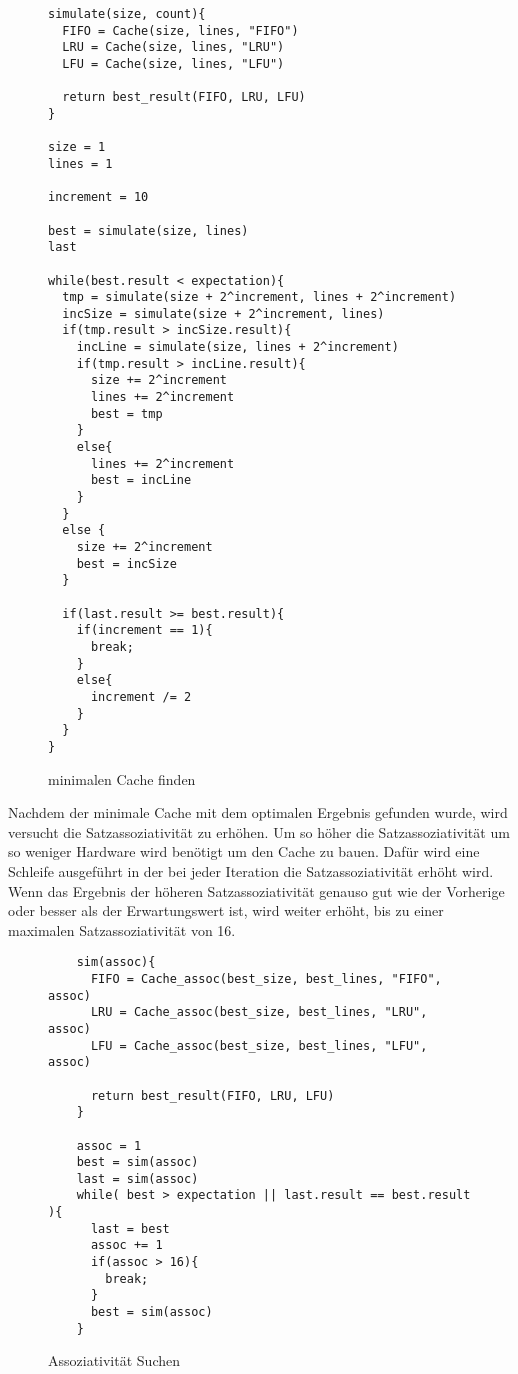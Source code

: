 \documentclass{scrreprt}
\begin{document}
\begin{figure}
\begin{lstlisting}
simulate(size, count){
  FIFO = Cache(size, lines, "FIFO")
  LRU = Cache(size, lines, "LRU")
  LFU = Cache(size, lines, "LFU")

  return best_result(FIFO, LRU, LFU)
}

size = 1
lines = 1

increment = 10

best = simulate(size, lines)
last

while(best.result < expectation){
  tmp = simulate(size + 2^increment, lines + 2^increment)
  incSize = simulate(size + 2^increment, lines)
  if(tmp.result > incSize.result){
    incLine = simulate(size, lines + 2^increment)
    if(tmp.result > incLine.result){
      size += 2^increment
      lines += 2^increment
      best = tmp
    }
    else{
      lines += 2^increment
      best = incLine
    }
  }
  else {
    size += 2^increment
    best = incSize
  }

  if(last.result >= best.result){
    if(increment == 1){
      break;
    }
    else{
      increment /= 2
    }
  }
}
\end{lstlisting}
\caption{minimalen Cache finden}\label{fig:size}
\end{figure}

Nachdem der minimale Cache mit dem optimalen Ergebnis gefunden wurde, wird versucht die Satzassoziativität zu erhöhen. Um so höher die Satzassoziativität um so weniger Hardware wird benötigt um den Cache zu bauen. Dafür wird eine Schleife ausgeführt in der bei jeder Iteration die Satzassoziativität erhöht wird. Wenn das Ergebnis der höheren Satzassoziativität genauso gut wie der Vorherige oder besser als der Erwartungswert ist, wird weiter erhöht, bis zu einer maximalen Satzassoziativität von 16.\newline

\begin{figure}
  \begin{lstlisting}
    sim(assoc){
      FIFO = Cache_assoc(best_size, best_lines, "FIFO", assoc)
      LRU = Cache_assoc(best_size, best_lines, "LRU", assoc)
      LFU = Cache_assoc(best_size, best_lines, "LFU", assoc)

      return best_result(FIFO, LRU, LFU)
    }

    assoc = 1
    best = sim(assoc)
    last = sim(assoc)
    while( best > expectation || last.result == best.result ){
      last = best
      assoc += 1
      if(assoc > 16){
        break;
      }
      best = sim(assoc)
    }
  \end{lstlisting}
  \caption{Assoziativität Suchen}\label{fig:assoc}
\end{figure}
\end{document}
